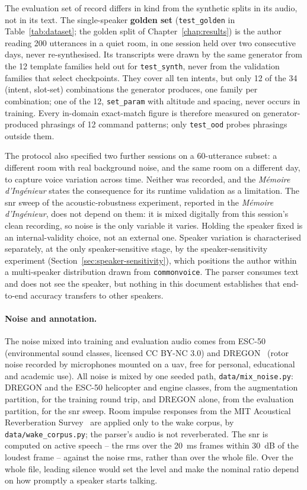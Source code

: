 The evaluation set of record differs in kind from the synthetic splits in its audio, not in its
text. The single-speaker \textbf{golden set} (\texttt{test\_golden} in Table~\ref{tab:dataset}; the
golden split of Chapter~\ref{chap:results}) is the author reading 200 utterances in a quiet room, in
one session held over two consecutive days, never re-synthesised. Its transcripts were drawn by
the same generator from the 12 template families held out for \texttt{test\_synth}, never from the
validation families that select checkpoints. They cover all ten intents, but only 12 of the 34
(intent, slot-set) combinations the generator produces, one family per combination; one of the 12,
\texttt{set\_param} with altitude and spacing, never occurs in training. Every in-domain exact-match
figure is therefore measured on generator-produced phrasings of 12 command patterns; only
\texttt{test\_ood} probes phrasings outside them.

The protocol also specified two further sessions on a 60-utterance subset: a different room with
real background noise, and the same room on a different day, to capture voice variation across time.
Neither was recorded, and the \emph{M\'emoire d'Ing\'enieur} states the consequence for its runtime
validation as a limitation. The \gls{snr} sweep of the acoustic-robustness experiment, reported in
the \emph{M\'emoire d'Ing\'enieur}, does not depend on them: it is mixed digitally from this
session's clean recording, so noise is the only variable it varies. Holding the speaker fixed is an
internal-validity choice, not an external one. Speaker variation is characterised separately, at
the only speaker-sensitive stage, by the speaker-sensitivity experiment
(Section~\ref{sec:speaker-sensitivity}), which positions the author within a multi-speaker distribution drawn from
\texttt{commonvoice}. The parser consumes text and does not see the speaker, but nothing in this
document establishes that end-to-end accuracy transfers to other speakers.

\paragraph{Noise and annotation.} \enlargethispage{\baselineskip} The noise mixed into training and evaluation audio comes from
ESC-50~\cite{esc50} (environmental sound classes, licensed CC BY-NC 3.0) and DREGON~\cite{dregon}
(rotor noise recorded by microphones mounted on a \gls{uav}, free for personal, educational and
academic use). All noise is mixed by one seeded path, \texttt{data/mix\_noise.py}: DREGON and the
ESC-50 helicopter and engine classes, from the augmentation partition, for the training round trip,
and DREGON alone, from the evaluation partition, for the \gls{snr} sweep. Room impulse responses
from the MIT Acoustical Reverberation Survey~\cite{traer2016} are applied only to the wake corpus,
by \texttt{data/wake\_corpus.py}; the parser's audio is not reverberated. The \gls{snr} is computed on active speech -- the
\gls{rms} over the 20~ms frames within 30~dB of the loudest frame -- against the noise \gls{rms},
rather than over the whole file. Over the whole file, leading silence would set the level and make
the nominal ratio depend on how promptly a speaker starts talking.

